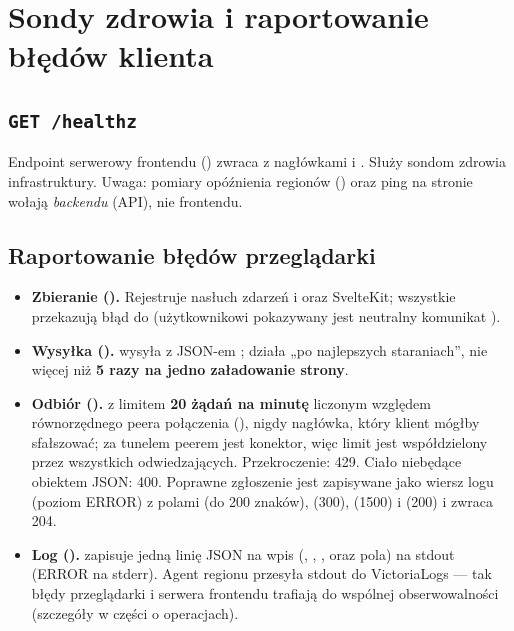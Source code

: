 \section{Sondy zdrowia i raportowanie błędów klienta}\label{sec:fe-bledy}

\subsection{\texttt{GET /healthz}}

Endpoint serwerowy frontendu () zwraca
 z nagłówkami  i
. Służy sondom zdrowia infrastruktury. Uwaga: pomiary opóźnienia
regionów () oraz ping na stronie  wołają 
\emph{backendu} (API), nie frontendu.

\subsection{Raportowanie błędów przeglądarki}

\begin{itemize}[nosep]
  \item \textbf{Zbieranie ().} Rejestruje nasłuch zdarzeń  i
         oraz  SvelteKit; wszystkie przekazują błąd do
         (użytkownikowi pokazywany jest neutralny komunikat
        ).
  \item \textbf{Wysyłka ().}  wysyła
         z JSON-em ;
        działa „po najlepszych staraniach”, nie więcej niż \textbf{5 razy na jedno załadowanie strony}.
  \item \textbf{Odbiór ().}  z limitem
        \textbf{20 żądań na minutę} liczonym względem równorzędnego peera połączenia
        (), nigdy nagłówka, który klient mógłby sfałszować; za tunelem peerem
        jest konektor, więc limit jest współdzielony przez wszystkich odwiedzających. Przekroczenie:
        429. Ciało niebędące obiektem JSON: 400. Poprawne zgłoszenie jest zapisywane jako wiersz logu
         (poziom ERROR) z polami  (do 200 znaków),  (300),
         (1500) i  (200) i zwraca 204.
  \item \textbf{Log ().}  zapisuje jedną linię
        JSON na wpis (, , ,  oraz pola) na
        stdout (ERROR na stderr). Agent regionu przesyła stdout do VictoriaLogs --- tak błędy
        przeglądarki i serwera frontendu trafiają do wspólnej obserwowalności (szczegóły w części
        o operacjach).
\end{itemize}

